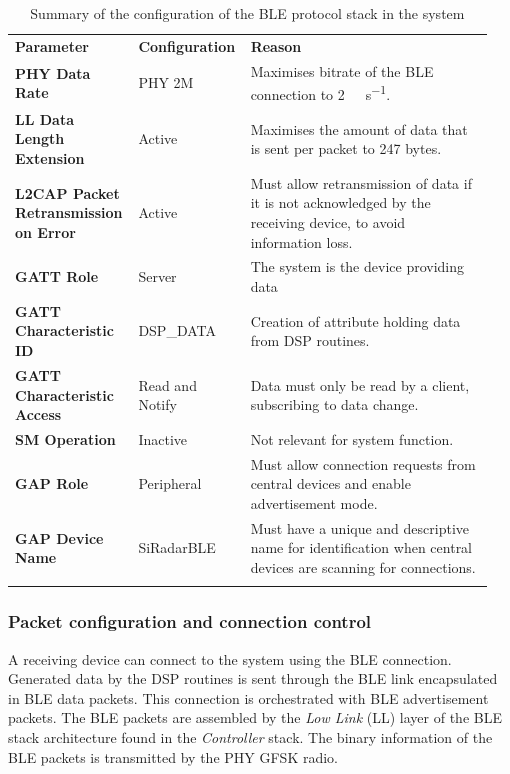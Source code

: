 {\footnotesize\renewcommand*{\arraystretch}{1.4}
\begin{longtable}{@{}>{\raggedright\arraybackslash\bfseries}m{0.25\linewidth}>{\raggedright\arraybackslash}m{0.2\linewidth}>{\raggedright\arraybackslash}m{0.5\linewidth}@{}}
	\toprule
	Parameter & \bfseries{Configuration} & \bfseries{Reason} \\* \midrule
	\endhead
	PHY Data Rate & PHY 2M & Maximises bitrate of the BLE connection to \SI{2}{\mega\bit\per\second}. \\
	LL Data Length Extension & Active & Maximises the amount of data that is sent per packet to 247 bytes.  \\
	L2CAP Packet Retransmission on Error & Active & Must allow retransmission of data if it is not acknowledged by the receiving device, to avoid information loss.  \\
	GATT Role & Server & The system is the device providing data\\
	GATT Characteristic ID & DSP\_DATA & Creation of attribute holding data from DSP routines.  \\
	GATT Characteristic Access & Read and Notify & Data must only be read by a client, subscribing to data change.  \\
	SM Operation & Inactive & Not relevant for system function.\\
	GAP Role & Peripheral & Must allow connection requests from central devices and enable advertisement mode. \\
	GAP Device Name & SiRadarBLE & Must have a unique and descriptive name for identification when central devices are scanning for connections.\\* \bottomrule
	\caption{Summary of the configuration of the BLE protocol stack in the system}
	\label{tab:ble_stack_config}
\end{longtable}}


\subsubsection{Packet configuration and connection control} \label{sec:ble_packet}

A receiving device can connect to the system using the BLE connection. Generated data by the DSP routines is sent through the BLE link encapsulated in BLE data packets. This connection is orchestrated with BLE advertisement packets. The BLE packets are assembled by the \textit{Low Link} (LL) layer of the BLE stack architecture found in the \textit{Controller} stack. The binary information of the BLE packets is transmitted by the PHY GFSK radio.

